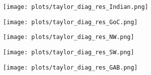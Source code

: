 \documentclass[jmse,article,accept,moreauthors,pdftex,10pt,a4paper]{mdpi}
\begin{document}
\begin{figure}[H]
\vspace{-10pt}
\centering
    \begin{subfigure}{0.30\textwidth}
        \texttt{[image: plots/taylor\_diag\_res\_Indian.png]}
        \caption{}
    \end{subfigure}
    \begin{subfigure}{0.30\textwidth}
        \texttt{[image: plots/taylor\_diag\_res\_GoC.png]}
        \caption{}
    \end{subfigure}
    \begin{subfigure}{0.30\textwidth}
        \texttt{[image: plots/taylor\_diag\_res\_NW.png]}
        \caption{}
    \end{subfigure}
  \begin{subfigure}{0.30\textwidth}
     \texttt{[image: plots/taylor\_diag\_res\_SW.png]}
        \caption{}
    \end{subfigure}
    \begin{subfigure}{0.30\textwidth}
        \texttt{[image: plots/taylor\_diag\_res\_GAB.png]}
        \caption{}
    \end{subfigure}
    \begin{subfigure}{0.30\textwidth}


\end{subfigure}
\end{figure}
\end{document}
